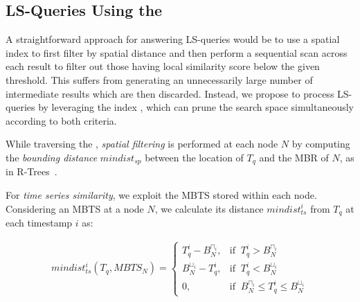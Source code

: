 \subsection{LS-Queries Using the \btsr}
\label{sec:ls_q_btsr}
A straightforward approach for answering LS-queries would be to use a spatial index to first filter by spatial distance and then perform a sequential scan across each result to filter out those having local similarity score below the given threshold. This suffers from generating an unnecessarily large number of intermediate results which are then discarded. Instead, we propose to process LS-queries by leveraging the \btsr index \cite{chatzig17btsr}, which can prune the search space simultaneously according to both criteria. 


While traversing the \btsr, {\em spatial filtering} is performed at each node $N$ by computing the {\em bounding distance} $mindist_{sp}$ between the location of $T_q$ and the MBR of $N$, as in R-Trees~\cite{DBLP:conf/sigmod/RoussopoulosKV95}.

  
  
For {\em time series similarity}, we exploit the MBTS stored within each node. Considering an MBTS at a node $N$, we calculate its distance $mindist_{ts}^i$ from $T_q$ at each timestamp $i$ as:
  
\begin{equation}
 \begin{split}
  mindist_{ts}^i(T_q, {MBTS}_N) = \begin{cases}
	T_q^i - B_{N}^{\sqcap_{i}}, & \text{if} \;\; T_q^i > B_{N}^{\sqcap_{i}} \\
	B_{N}^{\sqcup_{i}} - T_q^i, & \text{if} \;\; T_q^i < B_{N}^{\sqcup_{i}} \\
	0, & \text{if} \;\; B_{N}^{\sqcap_{i}} \leq T_q^i \leq B_{N}^{\sqcup_{i}}
	  \end{cases}
 \end{split}
 \label{eq:mindist_ts}
\end{equation}

